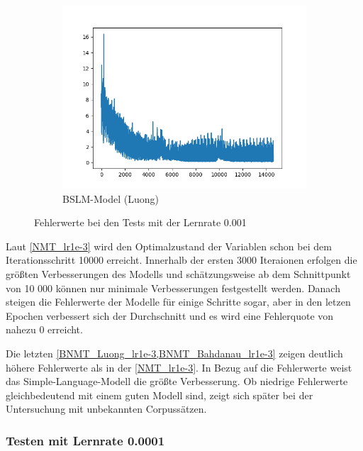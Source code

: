 \begin{figure}[p]
\begin{subfigure}[H]{\textwidth}
		\includegraphics[scale=0.55]{images/bslm_luong_100EP_1e-3.png}
		\caption{BSLM-Model (Luong)}
		\label{BNMT_Luong_lr1e-3}
	\end{subfigure}
	
	\caption{Fehlerwerte bei den Tests mit der Lernrate 0.001}
	\label{fig:three graphs}

\end{figure}
Laut \cref{NMT_lr1e-3} wird den Optimalzustand der Variablen schon bei dem Iterationsschritt 10000 erreicht. Innerhalb der ersten 3000 Iteraionen erfolgen die größten Verbesserungen des Modells und schätzungsweise ab dem Schnittpunkt von 10 000 können nur minimale Verbesserungen festgestellt werden. Danach steigen die Fehlerwerte der Modelle für einige Schritte sogar, aber in den letzen Epochen verbessert sich der Durchschnitt und es wird eine Fehlerquote von nahezu 0 erreicht. 

Die letzten \cref{BNMT_Luong_lr1e-3,BNMT_Bahdanau_lr1e-3} zeigen deutlich höhere Fehlerwerte als in der \cref{NMT_lr1e-3}. In Bezug auf die Fehlerwerte weist das Simple-Language-Modell die größte Verbesserung. Ob niedrige Fehlerwerte gleichbedeutend mit einem guten Modell sind, zeigt sich später bei der Untersuchung mit unbekannten Corpussätzen.

\subsubsection{Testen mit Lernrate 0.0001}

